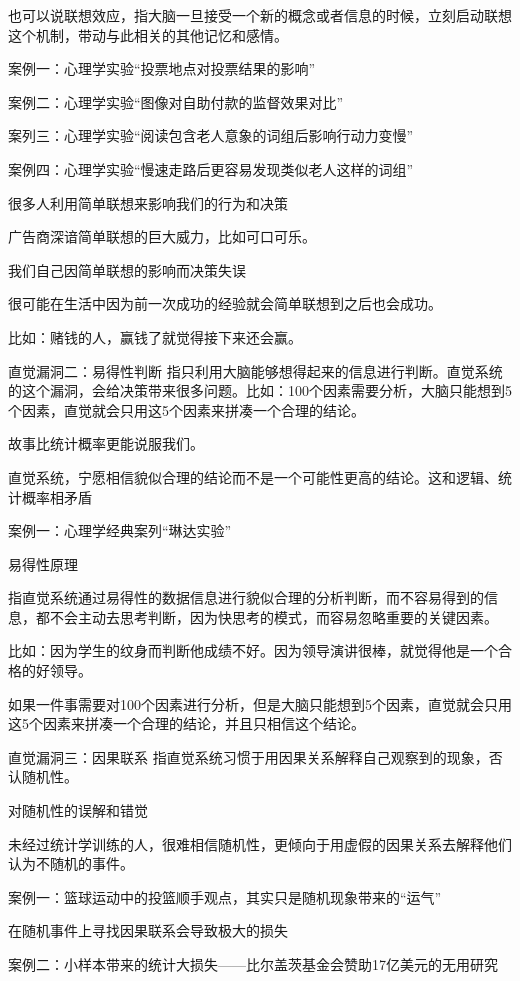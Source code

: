 \documentclass[12pt,]{krantz}
\begin{document}
也可以说联想效应，指大脑一旦接受一个新的概念或者信息的时候，立刻启动联想这个机制，带动与此相关的其他记忆和感情。

案例一：心理学实验``投票地点对投票结果的影响''

案例二：心理学实验``图像对自助付款的监督效果对比''

案列三：心理学实验``阅读包含老人意象的词组后影响行动力变慢''

案例四：心理学实验``慢速走路后更容易发现类似老人这样的词组''

很多人利用简单联想来影响我们的行为和决策

广告商深谙简单联想的巨大威力，比如可口可乐。

我们自己因简单联想的影响而决策失误

很可能在生活中因为前一次成功的经验就会简单联想到之后也会成功。

比如：赌钱的人，赢钱了就觉得接下来还会赢。

直觉漏洞二：易得性判断
指只利用大脑能够想得起来的信息进行判断。直觉系统的这个漏洞，会给决策带来很多问题。比如：100个因素需要分析，大脑只能想到5个因素，直觉就会只用这5个因素来拼凑一个合理的结论。

故事比统计概率更能说服我们。

直觉系统，宁愿相信貌似合理的结论而不是一个可能性更高的结论。这和逻辑、统计概率相矛盾

案例一：心理学经典案列``琳达实验''

易得性原理

指直觉系统通过易得性的数据信息进行貌似合理的分析判断，而不容易得到的信息，都不会主动去思考判断，因为快思考的模式，而容易忽略重要的关键因素。

比如：因为学生的纹身而判断他成绩不好。因为领导演讲很棒，就觉得他是一个合格的好领导。

如果一件事需要对100个因素进行分析，但是大脑只能想到5个因素，直觉就会只用这5个因素来拼凑一个合理的结论，并且只相信这个结论。

直觉漏洞三：因果联系
指直觉系统习惯于用因果关系解释自己观察到的现象，否认随机性。

对随机性的误解和错觉

未经过统计学训练的人，很难相信随机性，更倾向于用虚假的因果关系去解释他们认为不随机的事件。

案例一：篮球运动中的投篮顺手观点，其实只是随机现象带来的``运气''

在随机事件上寻找因果联系会导致极大的损失

案例二：小样本带来的统计大损失------比尔盖茨基金会赞助17亿美元的无用研究
\end{document}
